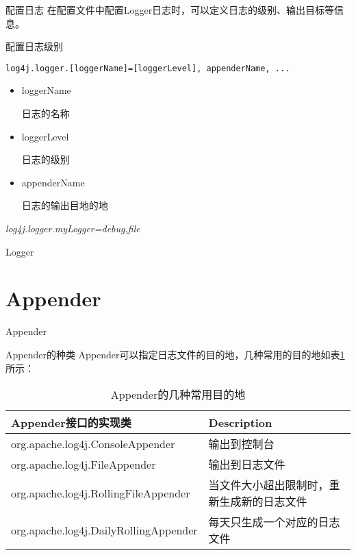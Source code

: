\documentclass{beamer}
\begin{document}
\begin{frame}[fragile]{配置日志}
在配置文件中配置Logger日志时，可以定义日志的级别、输出目标等信息。
\begin{block}{配置日志级别}
\begin{verbatim}
log4j.logger.[loggerName]=[loggerLevel], appenderName, ...
\end{verbatim}
\begin{itemize}
\item
loggerName

日志的名称
\item
loggerLevel

日志的级别
\item
appenderName

日志的输出目地的地
\end{itemize}
\emph{log4j.logger.myLogger=debug,file}
\end{block}

\end{frame}
\begin{frame}
\Huge{\centerline{Logger}}
\end{frame}
\section{Appender}
\begin{frame}
\Huge{\centerline{Appender}}
\end{frame}
\begin{frame}{Appender的种类}
Appender可以指定日志文件的目的地，几种常用的目的地如表\ref{appender}所示：
\begin{table}
\begin{tabular}{lp{12em}}
\toprule
\textbf{Appender接口的实现类}&\textbf{Description}\\
\midrule
org.apache.log4j.ConsoleAppender&输出到控制台\\
org.apache.log4j.FileAppender&输出到日志文件\\
org.apache.log4j.RollingFileAppender&当文件大小超出限制时，重新生成新的日志文件\\
org.apache.log4j.DailyRollingAppender&每天只生成一个对应的日志文件\\
\bottomrule
\end{tabular}
\caption{Appender的几种常用目的地}
\label{appender}
\end{table}
\end{frame}
\end{document}
